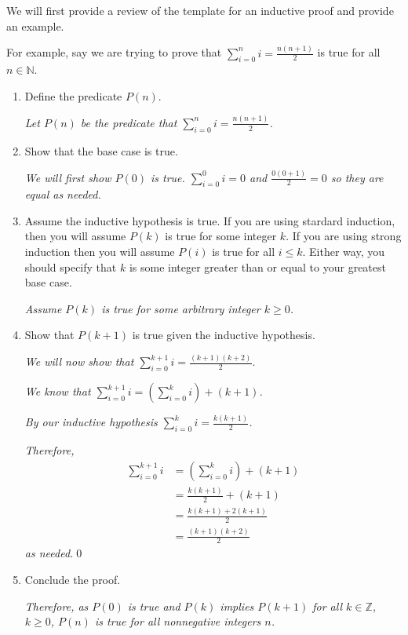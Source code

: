 \documentclass[12pt,letterpaper]{article}
\newcommand\Z{\mathbb Z}
\begin{document}
\begin{mdframed}
We will first provide a review of the template for an inductive proof and provide an example.

      For example, say we are trying to prove that $\sum_{i=0}^n i = \frac{n(n+1)}{2}$ is true for all $n \in \mathbb{N}$. 

      \begin{enumerate}
        \item Define the predicate $P(n)$.

        \textit{Let $P(n)$ be the predicate that $\sum_{i=0}^n i = \frac{n(n+1)}{2}$.}

        \item Show that the base case is true.

        \textit{We will first show $P(0)$ is true. $\sum_{i=0}^0 i = 0$ and $\frac{0(0+1)}{2} = 0$ so they are equal as needed.}

        \item Assume the inductive hypothesis is true. If you are using stardard induction, then you will assume 
			$P(k)$ is true for some integer $k$. If you are using strong induction then you will assume $P(i)$ is true for all $i \leq k$. Either way, you should specify that $k$ is some integer greater than or equal to your greatest base case.

        \textit{Assume $P(k)$ is true for some arbitrary integer $k \geq 0$.}

        \item Show that $P(k+1)$ is true given the inductive hypothesis.

		\textit{We will now show that  $\sum_{i=0}^{k+1} i = \frac{(k+1)(k+2)}{2}$}.

       	\textit{We know that $\sum_{i=0}^{k+1} i = \left( \sum_{i=0}^{k} i \right)+ (k+1)$.}

		\textit{By our inductive hypothesis $\sum_{i=0}^k i = \frac{k(k+1)}{2}$.}

         \textit{Therefore,}
		\begin{align*}
			\sum_{i=0}^{k+1} i &= \left( \sum_{i=0}^{k} i \right)+ (k+1) \\
			&=  \frac{k(k+1)}{2} + (k+1) \\
			&= \frac{k(k+1) + 2(k+1)}{2} \\
			&= \frac{(k+1)(k+2)}{2}
		\end{align*}
		\textit{as needed.}\qed

        \item Conclude the proof.
        
        \textit{Therefore, as $P(0)$ is true and $P(k)$ implies $P(k+1)$ for all $k \in \Z$, $k \geq 0$, $P(n)$ is true for all nonnegative integers $n$.}
      \end{enumerate}
\end{mdframed}
\end{document}

